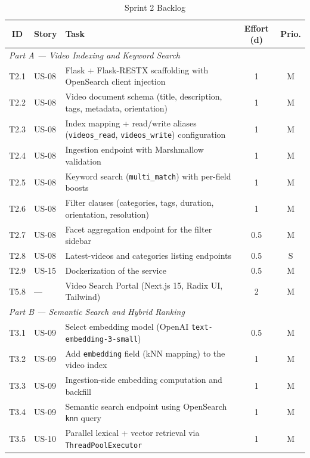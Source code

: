 \begin{table}[H]
\centering
\caption{Sprint 2 Backlog}
\label{tab:sprint2_backlog}
\begin{tabularx}{\textwidth}{clXcc}
\toprule
\textbf{ID} & \textbf{Story} & \textbf{Task} & \textbf{Effort (d)} & \textbf{Prio.} \\
\midrule
\multicolumn{5}{l}{\textit{Part A — Video Indexing and Keyword Search}} \\
\midrule
T2.1 & US-08 & Flask + Flask-RESTX scaffolding with OpenSearch client injection & 1 & M \\
T2.2 & US-08 & Video document schema (title, description, tags, metadata, orientation) & 1 & M \\
T2.3 & US-08 & Index mapping + read/write aliases (\texttt{videos\_read}, \texttt{videos\_write}) configuration & 1 & M \\
T2.4 & US-08 & Ingestion endpoint with Marshmallow validation                        & 1 & M \\
T2.5 & US-08 & Keyword search (\texttt{multi\_match}) with per-field boosts           & 1 & M \\
T2.6 & US-08 & Filter clauses (categories, tags, duration, orientation, resolution)  & 1 & M \\
T2.7 & US-08 & Facet aggregation endpoint for the filter sidebar                     & 0.5 & M \\
T2.8 & US-08 & Latest-videos and categories listing endpoints                        & 0.5 & S \\
T2.9 & US-15 & Dockerization of the service                                          & 0.5 & M \\
T5.8 & —     & Video Search Portal (Next.js 15, Radix UI, Tailwind)                  & 2   & M \\
\midrule
\multicolumn{5}{l}{\textit{Part B — Semantic Search and Hybrid Ranking}} \\
\midrule
T3.1 & US-09 & Select embedding model (OpenAI \texttt{text-embedding-3-small})     & 0.5 & M \\
T3.2 & US-09 & Add \texttt{embedding} field (kNN mapping) to the video index       & 1 & M \\
T3.3 & US-09 & Ingestion-side embedding computation and backfill                   & 1 & M \\
T3.4 & US-09 & Semantic search endpoint using OpenSearch \texttt{knn} query        & 1 & M \\
T3.5 & US-10 & Parallel lexical + vector retrieval via \texttt{ThreadPoolExecutor} & 1 & M \\

\end{tabularx}
\end{table}
